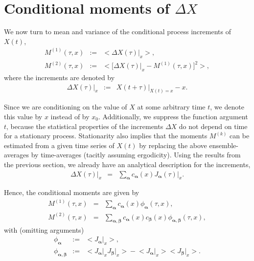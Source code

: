 \documentclass[aps,twocolumn,superscriptaddress,showpacs,showkeys]{revtex4}
\newcommand{\vecalpha}{{\boldsymbol{\alpha}}}
\newcommand{\vecbeta}{{\boldsymbol{\beta}}}
\begin{document}
\section{Conditional moments of $\Delta X$}
\label{sec_moments}

\noindent We now turn to mean and variance of the conditional process increments of $X(t)$,
%
\begin{subequations}
\begin{eqnarray}
M^{(1)}(\tau,x) &:=& \Big<\Delta X(\tau)\big|_x\Big>,\\
M^{(2)}(\tau,x) &:=& \Big<\big[\Delta X(\tau)\big|_x-M^{(1)}(\tau,x)\big]^2\Big>,
\end{eqnarray}
\end{subequations}
\noindent where the increments are denoted by
%
\begin{eqnarray}
\Delta X(\tau)\big|_x &:=& X(t+\tau)\big|_{X(t)=x}-x.
\end{eqnarray}

\noindent Since we are conditioning on the value of $X$ at some arbitrary time $t$, we denote this value by $x$ instead of
by $x_0$. Additionally, we suppress the function argument $t$, because the statistical properties of the increments $\Delta X$ do
not depend on time for a stationary process. Stationarity also implies that the moments $M^{(k)}$ can be estimated from a
given time series of $X(t)$ by replacing the above ensemble-averages by time-averages (tacitly assuming ergodicity).
Using the results from the previous section, we already have an analytical description for the increments,
%
\begin{eqnarray}
\Delta X(\tau)\big|_x &=& \sum_\vecalpha c_\vecalpha(x) J_\vecalpha(\tau)\big|_x.
\end{eqnarray}

\noindent Hence, the conditional moments are given by
%
\begin{subequations}\label{series_Mk}
\begin{eqnarray}\label{series_M1}
M^{(1)}(\tau,x) &=& \sum_\vecalpha c_\vecalpha(x) \phi_\vecalpha(\tau,x),\\\label{series_M2}
M^{(2)}(\tau,x) &=& \sum_{\vecalpha,\vecbeta} c_\vecalpha(x) c_\vecbeta(x) \phi_{\vecalpha,\vecbeta}(\tau,x),
\end{eqnarray}
\end{subequations}
\noindent with (omitting arguments)
%
\begin{subequations}
\begin{eqnarray}
\phi_\vecalpha &:=& \big<J_\vecalpha\big|_x\big>,\\
\phi_{\vecalpha,\vecbeta} &:=& \big<J_\vecalpha\big|_x J_\vecbeta\big|_x\big>
                                      -\big<J_\vecalpha\big|_x\big>\big<J_\vecbeta\big|_x\big>.
\end{eqnarray}
\end{subequations}
\end{document}
